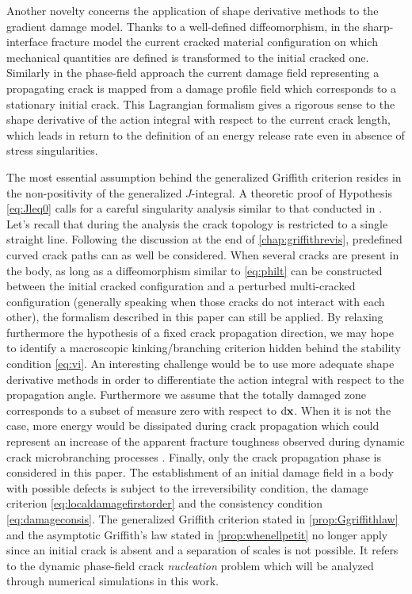 Another novelty concerns the application of shape derivative methods \cite{Destuynder:1981} to the gradient damage model. Thanks to a well-defined diffeomorphism, in the sharp-interface fracture model the current cracked material configuration on which mechanical quantities are defined is transformed to the initial cracked one. Similarly in the phase-field approach the current damage field representing a propagating crack is mapped from a damage profile field which corresponds to a stationary initial crack. This Lagrangian formalism gives a rigorous sense to the shape derivative of the action integral with respect to the current crack length, which leads in return to the definition of an energy release rate even in absence of stress singularities.

The most essential assumption behind the generalized Griffith criterion resides in the non-positivity of the generalized $J$-integral. A theoretic proof of Hypothesis \ref{eq:Jleq0} calls for a careful singularity analysis similar to that conducted in \cite{SicsicMarigo:2013}. Let's recall that during the analysis the crack topology is restricted to a single straight line. Following the discussion at the end of \cref{chap:griffithrevis}, predefined curved crack paths can as well be considered. When several cracks are present in the body, as long as a diffeomorphism similar to \eqref{eq:philt} can be constructed between the initial cracked configuration and a perturbed multi-cracked configuration (generally speaking when those cracks do not interact with each other), the formalism described in this paper can still be applied. By relaxing furthermore the hypothesis of a fixed crack propagation direction, we may hope to identify a macroscopic kinking/branching criterion hidden behind the stability condition \eqref{eq:vi}. An interesting challenge would be to use more adequate shape derivative methods \cite{Hintermuller:2011} in order to differentiate the action integral with respect to the propagation angle. Furthermore we assume that the totally damaged zone corresponds to a subset of measure zero with respect to $\md\vec{x}$. When it is not the case, more energy would be dissipated during crack propagation which could represent an increase of the apparent fracture toughness observed during dynamic crack microbranching processes \cite{SharonFineberg:1996}. Finally, only the crack propagation phase is considered in this paper. The establishment of an initial damage field in a body with possible defects is subject to the irreversibility condition, the damage criterion \eqref{eq:localdamagefirstorder} and the consistency condition \eqref{eq:damageconsis}. The generalized Griffith criterion stated in \cref{prop:Ggriffithlaw} and the asymptotic Griffith's law stated in \cref{prop:whenellpetit} no longer apply since an initial crack is absent and a separation of scales is not possible. It refers to the dynamic phase-field crack \emph{nucleation} problem which will be analyzed through numerical simulations in this work.

